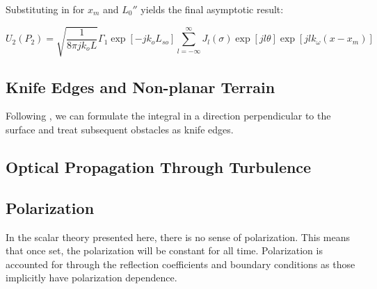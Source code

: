 \noindent Substituting in for $x_m$ and $L_0''$ yields the final asymptotic result:

\begin{equation}
\boxed{U_2(P_2) = \sqrt{\frac{1}{8\pi jk_o L}}\Gamma_1\exp[-jk_oL_{so}] \sum_{l=-\infty}^{\infty}J_l(\sigma)\exp\left[jl\theta\right]\exp\left[jlk_{\omega}(x-x_m)\right]} 
\label{gf_eq:72}
\end{equation}
\renewcommand{\baselinestretch}{2} \small\normalsize

\subsection {Knife Edges and Non-planar Terrain}
Following \cite{whitteker_diffraction}, we can formulate the integral in a direction perpendicular to the surface and treat subsequent obstacles as knife edges.

\subsection {Optical Propagation Through Turbulence}

\subsection{Polarization}
In the scalar theory presented here, there is no sense of polarization. This means that once set, the polarization will be constant for all time. Polarization is accounted for through the reflection coefficients and boundary conditions as those implicitly have polarization dependence.
